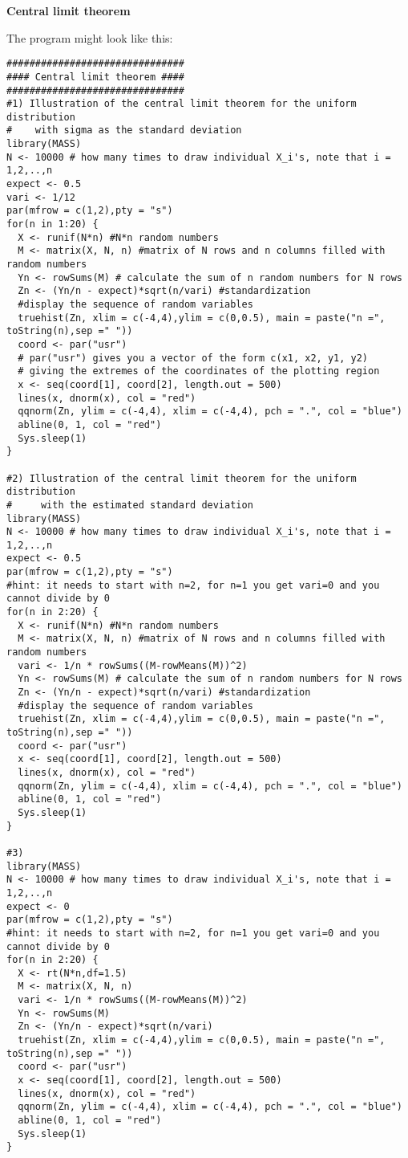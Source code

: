 \begin{Solution}{9.3}
\textbf{Central limit theorem}

The program might look like this:
\begin{verbatim}
###############################
#### Central limit theorem ####
###############################
#1) Illustration of the central limit theorem for the uniform distribution
#    with sigma as the standard deviation
library(MASS)
N <- 10000 # how many times to draw individual X_i's, note that i = 1,2,..,n
expect <- 0.5
vari <- 1/12
par(mfrow = c(1,2),pty = "s")
for(n in 1:20) {
  X <- runif(N*n) #N*n random numbers
  M <- matrix(X, N, n) #matrix of N rows and n columns filled with random numbers
  Yn <- rowSums(M) # calculate the sum of n random numbers for N rows
  Zn <- (Yn/n - expect)*sqrt(n/vari) #standardization
  #display the sequence of random variables
  truehist(Zn, xlim = c(-4,4),ylim = c(0,0.5), main = paste("n =", toString(n),sep =" "))
  coord <- par("usr")
  # par("usr") gives you a vector of the form c(x1, x2, y1, y2)
  # giving the extremes of the coordinates of the plotting region
  x <- seq(coord[1], coord[2], length.out = 500)
  lines(x, dnorm(x), col = "red")
  qqnorm(Zn, ylim = c(-4,4), xlim = c(-4,4), pch = ".", col = "blue")
  abline(0, 1, col = "red")
  Sys.sleep(1)
}

#2) Illustration of the central limit theorem for the uniform distribution
#     with the estimated standard deviation
library(MASS)
N <- 10000 # how many times to draw individual X_i's, note that i = 1,2,..,n
expect <- 0.5
par(mfrow = c(1,2),pty = "s")
#hint: it needs to start with n=2, for n=1 you get vari=0 and you cannot divide by 0
for(n in 2:20) {
  X <- runif(N*n) #N*n random numbers
  M <- matrix(X, N, n) #matrix of N rows and n columns filled with random numbers
  vari <- 1/n * rowSums((M-rowMeans(M))^2)
  Yn <- rowSums(M) # calculate the sum of n random numbers for N rows
  Zn <- (Yn/n - expect)*sqrt(n/vari) #standardization
  #display the sequence of random variables
  truehist(Zn, xlim = c(-4,4),ylim = c(0,0.5), main = paste("n =", toString(n),sep =" "))
  coord <- par("usr")
  x <- seq(coord[1], coord[2], length.out = 500)
  lines(x, dnorm(x), col = "red")
  qqnorm(Zn, ylim = c(-4,4), xlim = c(-4,4), pch = ".", col = "blue")
  abline(0, 1, col = "red")
  Sys.sleep(1)
}

#3)
library(MASS)
N <- 10000 # how many times to draw individual X_i's, note that i = 1,2,..,n
expect <- 0
par(mfrow = c(1,2),pty = "s")
#hint: it needs to start with n=2, for n=1 you get vari=0 and you cannot divide by 0
for(n in 2:20) {
  X <- rt(N*n,df=1.5)
  M <- matrix(X, N, n)
  vari <- 1/n * rowSums((M-rowMeans(M))^2)
  Yn <- rowSums(M)
  Zn <- (Yn/n - expect)*sqrt(n/vari)
  truehist(Zn, xlim = c(-4,4),ylim = c(0,0.5), main = paste("n =", toString(n),sep =" "))
  coord <- par("usr")
  x <- seq(coord[1], coord[2], length.out = 500)
  lines(x, dnorm(x), col = "red")
  qqnorm(Zn, ylim = c(-4,4), xlim = c(-4,4), pch = ".", col = "blue")
  abline(0, 1, col = "red")
  Sys.sleep(1)
}
\end{verbatim}
\end{Solution}
